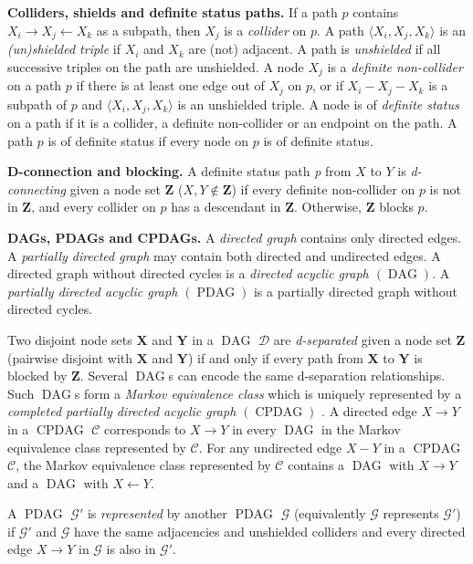 \documentclass[letterpaper]{article}
\theoremstyle{definition}
\theoremstyle{remark}
\DeclareMathOperator{\PDAG}{PDAG}
\DeclareMathOperator{\CPDAG}{CPDAG}
\DeclareMathOperator{\DAG}{DAG}
\newcommand{\g}[1][G]{\mathcal{#1}}
\begin{document}
\textbf{Colliders, shields and definite status paths.} If a path $p$ contains $X_i \rightarrow X_j \leftarrow X_k$ as a subpath, then $X_j$ is a \textit{collider} on $p$. A path $\langle X_{i},X_{j},X_{k} \rangle$ is an \emph{(un)shielded triple} if $ X_{i} $ and $ X_{k}$ are (not) adjacent. A path is \textit{unshielded} if all successive triples on the path are unshielded. A node $X_{j}$ is a \textit{definite non-collider} on a path $p$ if there is at least one edge out of $X_{j}$ on $p$, or if $X_{i} - X_j - X_k$ is a subpath of $p$ and $\langle X_i,X_j,X_k\rangle$ is an unshielded triple. A node is of \textit{definite status} on a path if it is a collider, a definite non-collider or an endpoint on the path. A path $p$ is of definite status if every node on $p$ is of definite status.

\textbf{D-connection and blocking.} A definite status path \textit{p} from $X$ to $Y$ is \textit{d-connecting} given a node set $\mathbf{Z}$ ($X,Y \notin \mathbf{Z}$) if every definite non-collider on $p$ is not in $\mathbf{Z}$, and every collider on $p$ has a descendant in $\mathbf{Z}$. Otherwise, $\mathbf{Z}$ blocks $p$.

\textbf{DAGs, PDAGs and CPDAGs.}
A \textit{directed graph} contains only directed edges.
A \textit{partially directed graph} may contain both directed and undirected edges.
A directed graph without directed cycles is a \textit{directed acyclic graph $(\DAG)$}.  A \textit{partially directed acyclic graph $(\PDAG)$} is a partially directed graph without directed cycles.

Two disjoint node sets $\mathbf{X}$ and $\mathbf{Y}$ in a $\DAG$ $\g[D]$ are \textit{d-separated} given a node set $\mathbf{Z}$ (pairwise disjoint with $\mathbf{X}$ and $\mathbf{Y}$) if and only if every path from $\mathbf{X}$ to $\mathbf{Y}$ is blocked by $\mathbf{Z}$. Several $\DAG$s can encode the same d-separation relationships. Such $\DAG$s form a \emph{Markov equivalence class} which is uniquely represented  by a \emph{completed partially directed acyclic graph $(\CPDAG)$} \citep{meek1995causal}.
A directed edge $X \rightarrow Y$ in a $\CPDAG$ $\g[C]$ corresponds to $X \rightarrow Y$ in every $\DAG$ in the Markov equivalence class represented by $\g[C]$.
For any undirected edge $X - Y$ in a $\CPDAG$ $\g[C]$, the Markov equivalence class represented by $\g[C]$ contains a $\DAG$ with $X \rightarrow Y$ and a $\DAG$ with $X \leftarrow Y$.

A $\PDAG$ $\g'$ is \textit{represented} by another $\PDAG$ $\g$ (equivalently $\g$ represents $\g'$) if $\g'$ and $\g$ have the same adjacencies and unshielded colliders and every directed edge $X \rightarrow Y$ in $\g$ is also in $\g'$.
\end{document}
